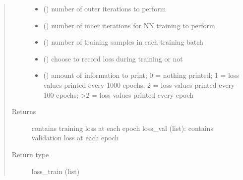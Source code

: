 \documentclass[letterpaper,10pt,english]{sphinxmanual}
\begin{document}
\begin{fulllineitems}
\begin{fulllineitems}
\begin{quote}
\begin{description}
\begin{itemize}
\item {} 
\sphinxAtStartPar
{} () \textendash{} number of outer iterations to perform

\item {} 
\sphinxAtStartPar
{} () \textendash{} number of inner iterations for NN training to perform

\item {} 
\sphinxAtStartPar
{} () \textendash{} number of training samples in each training batch

\item {} 
\sphinxAtStartPar
{} () \textendash{} choose to record loss during training or not

\item {} 
\sphinxAtStartPar
{} () \textendash{} amount of information to print; 0 = nothing printed; 1 = loss values printed every 1000 epochs; 2 = loss values printed every 100 epochs; \textgreater{}2 = loss values printed every epoch

\end{itemize}

\item[{Returns}] \leavevmode
\sphinxAtStartPar
contains training loss at each epoch
loss\_val (list): contains validation loss at each epoch

\item[{Return type}] \leavevmode
\sphinxAtStartPar
loss\_train (list)

\end{description}\end{quote}

\end{fulllineitems}



\end{fulllineitems}
\end{document}
